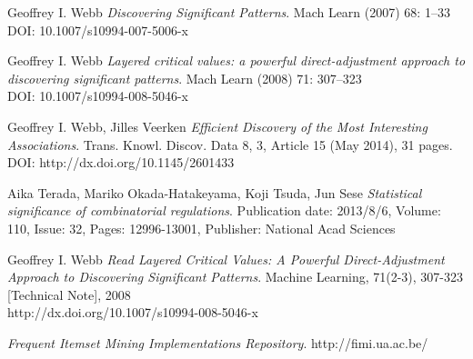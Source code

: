 \documentclass[10pt,a4paper]{article}
\begin{document}
\pagebreak
\begin{thebibliography}{9}

Geoffrey I. Webb
\textit{Discovering Significant Patterns}. 
Mach Learn (2007) 68: 1–33\\
DOI: 10.1007/s10994-007-5006-x

Geoffrey I. Webb
\textit{Layered critical values: a powerful direct-adjustment
approach to discovering significant patterns}. 
Mach Learn (2008) 71: 307–323\\
DOI: 10.1007/s10994-008-5046-x

Geoffrey I. Webb, Jilles Veerken
\textit{Efficient Discovery of the Most Interesting Associations}. 
Trans. Knowl. Discov. Data 8, 3, Article 15 (May 2014), 31 pages.\\
DOI: http://dx.doi.org/10.1145/2601433

Aika Terada, Mariko Okada-Hatakeyama, Koji Tsuda, Jun Sese 
\textit{Statistical significance of combinatorial regulations}. 
Publication date: 2013/8/6, Volume: 110, Issue: 32, Pages: 12996-13001, Publisher: National Acad Sciences

Geoffrey I. Webb
\textit{Read Layered Critical Values: A Powerful Direct-Adjustment Approach to Discovering Significant Patterns}. 
Machine Learning, 71(2-3), 307-323 [Technical Note], 2008\\
http://dx.doi.org/10.1007/s10994-008-5046-x


\textit{Frequent Itemset Mining Implementations Repository}. 
http://fimi.ua.ac.be/


\end{thebibliography}
\end{document}
